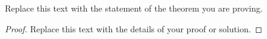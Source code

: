 \documentclass{article}
\newenvironment{theorem}[2][Theorem]{\begin{trivlist}
\item[\hskip \labelsep {\bfseries #1}\hskip \labelsep {\bfseries #2.}]}{\end{trivlist}}
\begin{document}
\vspace{0.25in} %

\begin{theorem}{x.yz}
Replace this text with the statement of the theorem you are proving.
\end{theorem}

\begin{proof}
Replace this text with the details of your proof or solution.
\end{proof}

\end{document}
